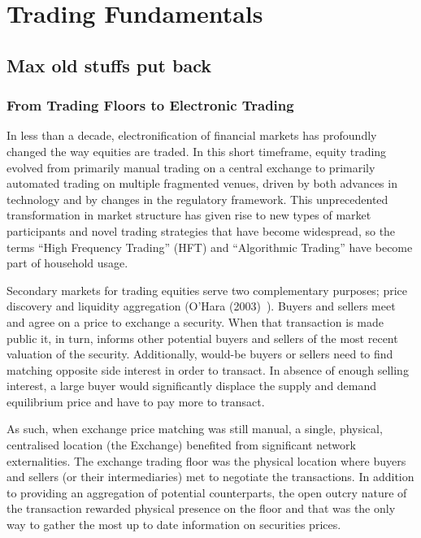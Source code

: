 \chapter{Trading Fundamentals \label{chap:ch_trading_fund}}

\section{Max old stuffs put back}

\subsection{From Trading Floors to Electronic Trading}

In less than a decade, electronification of financial markets has profoundly changed the way equities are traded. In this short timeframe, equity trading evolved from primarily manual trading on a central exchange to primarily automated trading on multiple fragmented venues, driven by both advances in technology and by changes in the regulatory framework. This unprecedented transformation in market structure has given rise to new types of market participants and novel trading strategies that have become widespread, so the terms ``High Frequency Trading'' (HFT) and ``Algorithmic Trading'' have become part of household usage.


Secondary markets for trading equities serve two complementary purposes; price discovery and liquidity aggregation (O'Hara (2003)~\cite{ohara}). Buyers and sellers meet and agree on a price to exchange a security. When that transaction is made public it, in turn, informs other potential buyers and sellers of the most recent valuation of the security.  Additionally, would-be buyers or sellers need to find matching opposite side interest in order to transact. In absence of enough selling interest, a large buyer would significantly displace the supply and demand equilibrium price and have to pay more to transact.


As such, when exchange price matching was still manual, a single, physical, centralised location (the Exchange) benefited from significant network externalities. The exchange trading floor was the physical location where buyers and sellers (or their intermediaries) met to negotiate the transactions. In addition to providing an aggregation of potential counterparts, the open outcry nature of the transaction rewarded physical presence on the floor and that was the only way to gather the most up to date information on securities prices.



